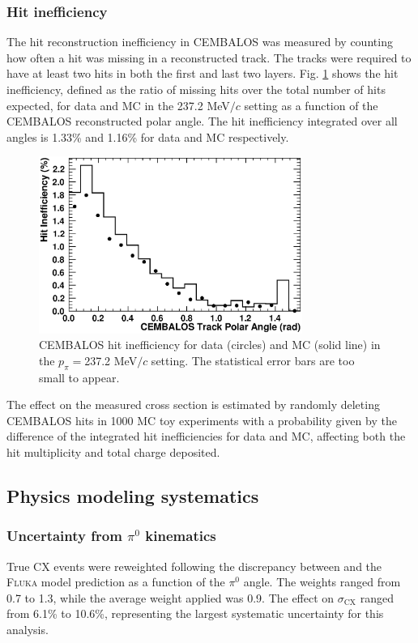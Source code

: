 \subsubsection{\bf Hit inefficiency}
The hit reconstruction inefficiency in CEMBALOS was measured by counting how often a hit was missing in a reconstructed track. The tracks were required to have at least two hits in both the first and last two layers. Fig. \ref{fig:hit_ineff} shows the hit inefficiency, defined as the ratio of missing hits over the total number of hits expected, for data and MC in the 237.2 MeV$/c$ setting as a function of the CEMBALOS reconstructed polar angle. The hit inefficiency integrated over all angles is 1.33\% and 1.16\% for data and MC respectively.
\begin{figure}[ht]
 \includegraphics[width=86mm]{figures/cembalos_hit_ineff_237.eps}
 \caption{CEMBALOS hit inefficiency for data (circles) and MC (solid line) in the $p_\pi=$237.2 MeV$/c$ setting. {\color{red}The statistical error bars are too small to appear}.}
 \label{fig:hit_ineff}
\end{figure}

The effect on the measured cross section is estimated by randomly deleting CEMBALOS hits in 1000 MC toy experiments with a probability given by the difference of the integrated hit inefficiencies for data and MC, affecting both the hit multiplicity and total charge deposited.

\subsection{Physics modeling systematics}\label{sec:physics_syst}
\subsubsection{\bf{{\color{red} Uncertainty from} $\pi^{0}$ kinematics }}
True CX events were reweighted following the discrepancy between \cite{Ashery2} and the \textsc{Fluka} model prediction as a function of the $\pi^{0}$ angle. The weights ranged from 0.7 to 1.3, while the average weight applied was 0.9. The effect on $\sigma_{\mathrm{CX}}$ ranged  from 6.1\% to 10.6\%, representing the largest systematic uncertainty for this analysis.

